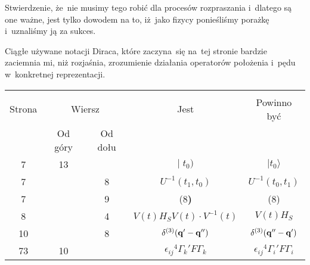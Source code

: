 \documentclass[a4paper,11pt]{article}
\begin{document}
Stwierdzenie, że~nie musimy tego robić dla procesów rozpraszania
i~dlatego są one ważne, jest tylko dowodem na to, iż~jako fizycy
ponieśliśmy porażkę i~uznaliśmy ją za sukces.

\vspace{\spaceFour}



\start {}

\vspace{\spaceFour}



\start {} Ciągłe używane notacji Diraca, które zaczyna~się
na~tej stronie bardzie zaciemnia mi, niż rozjaśnia, zrozumienie
działania operatorów położenia i~pędu w~konkretnej reprezentacji.

\vspace{\spaceFour}



\start {}

\vspace{\spaceFour}







\begin{center}
  \begin{tabular}{|c|c|c|c|c|}
    \hline
    & \multicolumn{2}{c|}{} & & \\
    Strona & \multicolumn{2}{c|}{Wiersz} & Jest
                              & Powinno być \\ \cline{2-3}
    & Od góry & Od dołu &  &  \\
    \hline
    7 & 13 & & $| \; t_{ 0 } )$ & $| t_{ 0 } \rangle$ \\
    7 & & 8 & $U^{ -1 }( t_{ 1 }, t_{ 0 } )$
           & $U^{ -1 }( t_{ 0 }, t_{ 1 } )$ \\
    7 & & 9 & (8\textbf{)} & (8) \\
    8 & & 4 & $V( t ) H_{ S } V( t ) \cdot V^{ -1 }( t )$
           & $V( t ) H_{ S }$ \\
    10 & & 8 & $\delta^{ ( 3 ) }( \mathbf{q}' - \mathbf{q}'' )$
           & $\delta^{ ( 3 ) }( \mathbf{q}'' - \mathbf{q}' )$ \\
    73 & 10 & & $\epsilon_{ i j }{}^{ 4 } \Gamma_{ k }{}' F \Gamma_{ k }$
           & $\epsilon_{ i j }{}^{ 4 } \Gamma_{ i }{}' F \Gamma_{ i }$ \\
    \hline
  \end{tabular}
\end{center}
\end{document}
